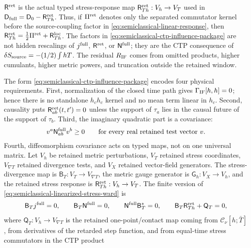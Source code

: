 \begin{controlledapproximation}
\(\mathsf R^{\rm ret}\) is the actual typed stress-response map
\(\mathsf R^{\rm ret}_{Th}:V_h\to V_T\) used in
\(\mathsf D_{\rm full}=\mathsf D_0-\mathsf R^{\rm ret}_{Th}\).  Thus, if
\(\Pi^{\rm ret}\) denotes only the separated commutator kernel before the
source-coupling factor in \eqref{eq:semiclassical-linear-response}, then
\(\mathsf R^{\rm ret}_{Th}=\frac12\Pi^{\rm ret}+\mathsf R^{\rm loc}_{Th}\).
The factors in \eqref{eq:semiclassical-ctp-influence-package} are not hidden
rescalings of \(j^{\rm full}\), \(\mathsf R^{\rm ret}\), or
\(\mathsf N^{\rm full}\); they are the CTP consequence of
\(\delta S_{\rm source}=-(1/2)\int hT\).  The residual \(R_{\rm IF}\) comes from
omitted products, higher cumulants, higher metric powers, and truncation outside
the retained window.

The form \eqref{eq:semiclassical-ctp-influence-package} encodes four physical
requirements.  First, normalization of the closed time path gives
\(\Gamma_{\rm IF}[h,h]=0\); hence there is no standalone \(h_c h_c\) kernel
and no mean term linear in \(h_c\).  Second, causality puts
\(\mathsf R^{\rm ret}_{ab}(t,t')=0\) unless the support of \(\tau_a\) lies in
the causal future of the support of \(\tau_b\).  Third, the imaginary quadratic
part is a covariance:
\begin{equation}
  v^a\mathsf N_{ab}^{\rm full}v^b\ge0
  \qquad
  \text{for every real retained test vector }v .
  \label{eq:semiclassical-ctp-noise-positivity}
\end{equation}
Fourth, diffeomorphism covariance acts on typed maps, not on one universal
matrix.  Let \(V_h\) be retained metric perturbations, \(V_T\) retained stress
coordinates, \(V_{\nabla T}\) retained divergence tests, and \(V_X\) retained
vector-field generators.  The stress-divergence map is
\(\mathsf B_T:V_T\to V_{\nabla T}\), the metric gauge generator is
\(\mathsf G_h:V_X\to V_h\), and the retained stress response is
\(\mathsf R^{\rm ret}_{Th}:V_h\to V_T\).  The finite version of
\eqref{eq:semiclassical-linearized-stress-ward} is
\begin{equation}
  \mathsf B_T j^{\rm full}=0,\qquad
  \mathsf B_T\mathsf N^{\rm full}=0,\qquad
  \mathsf N^{\rm full}\mathsf B_T^*=0,\qquad
  \mathsf B_T\mathsf R^{\rm ret}_{Th}
  +
  \mathsf Q_T=0,
  \label{eq:semiclassical-ctp-package-ward}
\end{equation}
where \(\mathsf Q_T:V_h\to V_{\nabla T}\) is the retained one-point/contact map
coming from \(\mathcal C_\nu[h;\bar T]\), from derivatives of the retarded
step function, and from equal-time stress commutators in the CTP product

\end{controlledapproximation}
